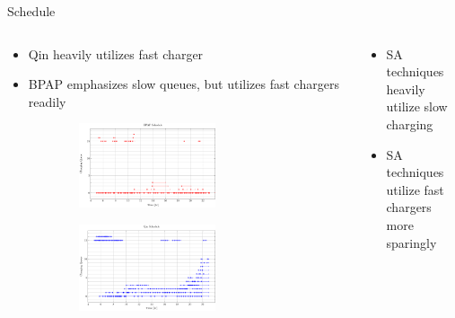 \documentclass[aspectratio=169,dvipsnames]{beamer}
\begin{document}
\begin{frame}[label={sec:org81d817a}]{Schedule}
\begin{columns}
\begin{column}{0.5\columnwidth}
{\scriptsize
\begin{itemize}
\item Qin heavily utilizes fast charger
\item BPAP emphasizes slow queues, but utilizes fast chargers readily
\end{itemize}
}

\begin{figure}
\begin{subfigure}[t]{\textwidth}
\centering
    \includegraphics[width=0.7\textwidth]{img/sa-pap-paper-good/schedule-milp}
\end{subfigure}
\begin{subfigure}[t]{\textwidth}
\centering
    \includegraphics[width=0.7\textwidth]{img/sa-pap-paper-good/schedule-qin}
\end{subfigure}
\end{figure}
\end{column}

\begin{column}{0.5\columnwidth}
{\scriptsize
\begin{itemize}
\item SA techniques heavily utilize slow charging
\item SA techniques utilize fast chargers more sparingly
\end{itemize}
}


\end{column}
\end{columns}
\end{frame}
\end{document}
